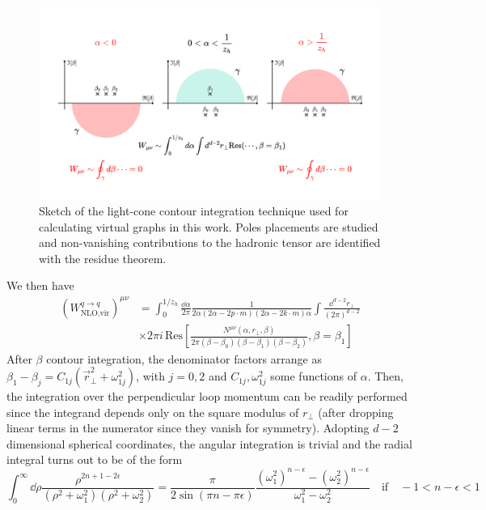 \begin{figure}
    \centering
    \includegraphics[width=0.95\linewidth]{fig/beta contour.pdf}
    \caption{Sketch of the light-cone contour integration technique used for calculating virtual graphs in this work. Poles placements are studied and non-vanishing contributions to the hadronic tensor are identified with the residue theorem.}
    \label{fig:beta contour}
\end{figure}
We then have
\begin{equation}
\begin{aligned}
       (W^{q \to q}_{\text{NLO,vir}})^{\mu\nu} &=\int_0^{1/z_h}\frac{\dd \alpha}{2\pi} \frac{1}{2\alpha(2\alpha-2p \cdot m)(2\alpha-2 k \cdot m)\alpha}\int \frac{\dd^{d-2}r_\perp}{(2\pi)^{d-2}}\\
       &\times 2\pi i\,\mathrm{Res}\left[\frac{N^{\mu\nu}(\alpha,r_\perp,\beta)}{2\pi(\beta-\beta_0)(\beta-\beta_1)(\beta-\beta_2)},\beta=\beta_1\right]
\end{aligned}
\end{equation}
After $\beta$ contour integration, the denominator factors arrange as $\beta_1-\beta_j=C_{1j}(\vec r_\perp^2+\omega^2_{1j})$, with $j=0,2$ and $C_{1j},\omega^2_{1j}$ some functions of $\alpha$. Then, the integration over the perpendicular loop momentum can be readily performed since the integrand depends only on the square modulus of $r_\perp$ (after dropping linear terms in the numerator since they vanish for symmetry). Adopting $d-2$ dimensional spherical coordinates, the angular integration is trivial and the radial integral turns out to be of the form
\begin{equation}
    \int_0^\infty \dd \rho \frac{ \rho^{2n+1-2\epsilon}}{(\rho^2+\omega^2_1)(\rho^2+\omega^2_2)}=\frac{\pi}{2\sin(\pi n-\pi\epsilon)}\frac{(\omega^2_1)^{n-\epsilon}-(\omega^2_2)^{n-\epsilon}}{\omega^2_1-\omega^2_2}\quad \text{if} \quad -1<n-\epsilon<1
\end{equation}
